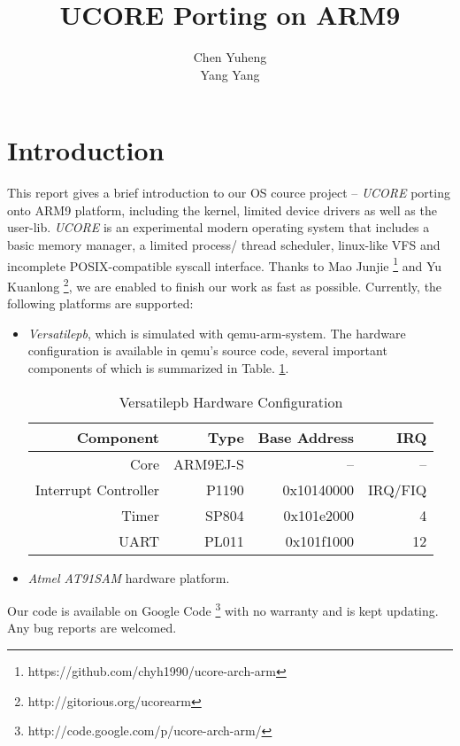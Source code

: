 \documentclass[a4paper]{article}
\begin{document}
\title{UCORE Porting on ARM9}
\author{Chen Yuheng \\ Yang Yang}
\maketitle

\section{Introduction}
This report gives a brief introduction to our OS cource project -- 
\emph{UCORE} porting onto ARM9 platform, including the kernel, limited
device drivers as well as the user-lib. \emph{UCORE} is an experimental 
modern operating system that includes a basic memory manager, a limited process/
thread scheduler, linux-like VFS and incomplete POSIX-compatible syscall 
interface. Thanks to Mao Junjie
\footnote{https://github.com/chyh1990/ucore-arch-arm} and Yu Kuanlong
\footnote{http://gitorious.org/ucorearm}, we are enabled to finish our
 work as fast as possible. Currently, the following platforms are supported:
 \begin{itemize}
   \item \emph{Versatilepb}, which is simulated with qemu-arm-system.
     The hardware configuration is available in qemu's source code,
     several important components of which is summarized in
     Table. \ref{tab:versatile1}.
     \begin{table}[h]
       \centering
       \begin{tabular}{|r|rrr|}
         \hline
         Component & Type & Base Address &  IRQ \\
         \hline
         Core     &  ARM9EJ-S & -- & -- \\
         Interrupt Controller & P1190 & 0x10140000 & IRQ/FIQ \\
         Timer    &  SP804    & 0x101e2000 & 4 \\
         UART     &  PL011  & 0x101f1000 & 12  \\
         \hline
       \end{tabular}
       \caption{Versatilepb Hardware Configuration}
       \label{tab:versatile1}
     \end{table}

   \item \emph{Atmel AT91SAM} hardware platform.
 \end{itemize}

Our code is available on Google Code
\footnote{http://code.google.com/p/ucore-arch-arm/} with no warranty and
is kept updating. Any bug reports are welcomed.
\end{document}
